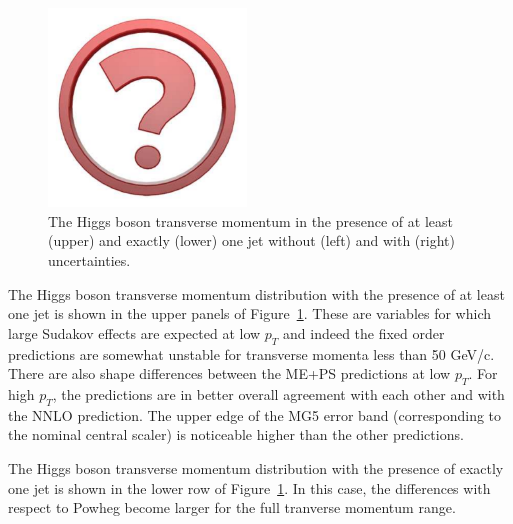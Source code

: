 \begin{figure}[t!]
  \hfill
  \includegraphics[width=0.47\textwidth]{Micon.pdf}
  \caption{
    The Higgs boson transverse momentum in the presence of at least
    (upper) and exactly (lower) one jet without (left) and with
    (right) uncertainties.
    \label{fig:higgscomp:results:1obs:hpt_j}
  }
\end{figure}

The Higgs boson transverse momentum distribution with the presence of
at least one jet is shown in the upper panels of
Figure~\ref{fig:higgscomp:results:1obs:hpt_j}. These are variables for
which large Sudakov effects are expected at low $p_T$ and indeed the
fixed order predictions are somewhat unstable for transverse momenta
less than 50 GeV/c. There are also shape differences between the ME+PS
predictions at low $p_T$. For high $p_T$, the predictions are in
better overall agreement with each other and with the NNLO
prediction. The upper edge of the MG5 error band (corresponding to the
nominal central scaler) is noticeable higher than the other
predictions.

The Higgs boson transverse momentum distribution with the presence of
exactly one jet is shown in the lower row of
Figure~\ref{fig:higgscomp:results:1obs:hpt_j}. In this case, the
differences with respect to Powheg become larger for the full
tranverse momentum range.


